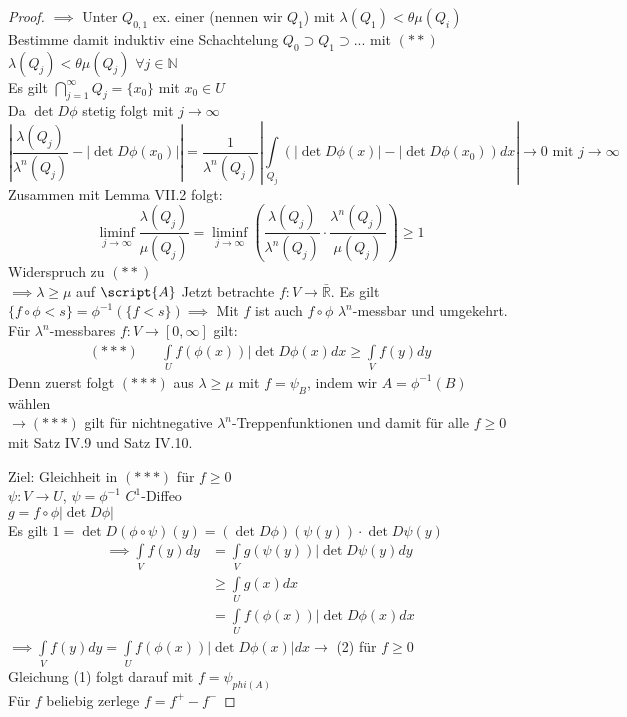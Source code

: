 \begin{proof}
	$\implies$ Unter $Q_{0,1}$ ex. einer (nennen wir $Q_1$) mit $\lambda(Q_1) < \theta \mu(Q_i)$ \\
	Bestimme damit induktiv eine Schachtelung $Q_0 \supset Q_1 \supset ...$ mit $(\ast\ast)$ $\lambda(Q_j) < \theta \mu(Q_j)$ $\forall j\in\mathbb{N}$ \\
	Es gilt $\bigcap\limits_{j=1}^\infty Q_j = \{x_0\}$ mit $x_0 \in U$ \\
	Da $\det{D\phi}$ stetig folgt mit $j\to\infty$ 
	$$ \left| \frac{\lambda(Q_j)}{\lambda^n(Q_j)} - |\det{D\phi(x_0)}|\right| = \frac{1}{\lambda^n(Q_j)} \left| \int\limits_{Q_j} (|\det{D\phi(x)}|-|\det{D\phi(x_0)})dx\right| \to 0 \text{ mit } j\to \infty$$
	Zusammen mit Lemma VII.2 folgt: 
	$$ \liminf\limits_{j\to\infty} \frac{\lambda(Q_j)}{\mu(Q_j)} = \liminf\limits_{j\to\infty} \left( \frac{\lambda(Q_j)}{\lambda^n(Q_j)} \cdot \frac{\lambda^n(Q_j)}{\mu(Q_j)}\right) \geq 1 $$
	Widerspruch zu $(\ast\ast)$ \\
	$\implies \lambda\geq\mu$ auf $\script{A}$
	Jetzt betrachte $f: V\to \mathbb{\bar{R}}$. Es gilt $\{f \circ \phi < s \} = \phi^{-1}(\{f < s \}) \implies $ Mit $f$ ist auch $f\circ \phi$ $\lambda^n$-messbar und umgekehrt. \\
	Für $\lambda^n$-messbares $f: V\to [0,\infty]$ gilt: 
	\begin{align*}
		(\ast\ast\ast) && \int\limits_U f(\phi(x)) |\det{D\phi(x)} dx \geq \int\limits_V f(y) dy
	\end{align*}
	Denn zuerst folgt $(\ast\ast\ast)$ aus $\lambda\geq\mu$ mit $f = \psi_B$, indem wir $A = \phi^{-1}(B)$ wählen \\
	$\rightarrow (\ast\ast\ast)$ gilt für nichtnegative $\lambda^n$-Treppenfunktionen und damit für alle $f\geq 0$ mit Satz IV.9 und Satz IV.10.
	\item[Ziel:] Gleichheit in $(\ast\ast\ast)$ für $f\geq 0$ \\
	$\psi:V\to U$, $\psi = \phi^{-1}$ $C^1$-Diffeo \\
	$g = f\circ\phi |\det{D\phi}| $ \\
	Es gilt $1 = \det{D(\phi\circ\psi)}(y) = (\det{D\phi})(\psi(y)) \cdot \det{D\psi}(y)$ \\
	\begin{align*}
	\implies \int\limits_V f(y)dy &= \int\limits_V g(\psi(y)) |\det{D\psi(y)} dy \\
	&\geq \int\limits_U g(x) dx \\
	&= \int\limits_U f(\phi(x)) |\det{D\phi(x)} dx
	\end{align*}
	$\implies \int\limits_V f(y)dy = \int\limits_U f(\phi(x)) |\det{D\phi(x)}| dx \rightarrow$ (2) für $f\geq 0$ \\
	Gleichung (1) folgt darauf mit $f = \psi_{phi(A)}$  \\
	Für $f$ beliebig zerlege $f = f^+ -f^-$
  \end{proof}

